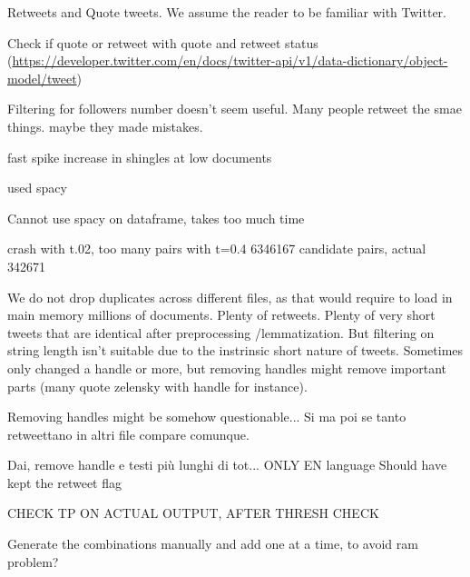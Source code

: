 \documentclass[runningheads]{llncs}
\begin{document}
Retweets and Quote tweets. We assume the reader to be familiar with Twitter.

Check if quote or retweet with quote and retweet status (\url{https://developer.twitter.com/en/docs/twitter-api/v1/data-dictionary/object-model/tweet})

Filtering for followers number doesn't seem useful. Many people retweet the smae things. maybe they made mistakes.

fast spike increase in shingles at low documents

used spacy 

Cannot use spacy on dataframe, takes too much time

crash with t.02, too many pairs
with t=0.4 6346167 candidate pairs, actual 342671 

We do not drop duplicates across different files, as that would require to load in main memory millions of documents. Plenty of retweets. Plenty of very short tweets that are identical after preprocessing /lemmatization. But filtering on string length isn't suitable due to the instrinsic short nature of tweets.  
Sometimes only changed a handle or more, but removing handles might remove important parts (many quote zelensky with handle for instance).

Removing handles might be somehow questionable... Si ma poi se tanto retweettano in altri file compare comunque.

Dai, remove handle e testi più lunghi di tot...
ONLY EN language
Should have kept the retweet flag


CHECK TP ON ACTUAL OUTPUT, AFTER THRESH CHECK

Generate the combinations manually and add one at a time, to avoid ram problem?



\end{document}
